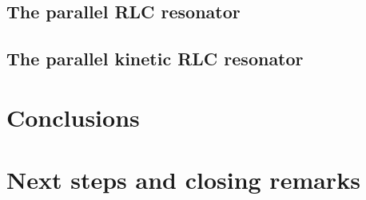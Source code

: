 \documentclass{article}
\numberwithin{equation}{section}
\begin{document}
\subsection{The parallel RLC resonator}
\label{subsec:ParallelRLC}


\subsection{The parallel kinetic RLC resonator}
\label{subsec:KineticRLC}


\newpage
\section{Conclusions}
\label{sec:Conclusions}


\section{Next steps and closing remarks} %
\label{sec:NextSteps}


\nocite{zhaoPhysicsSuperconductingTravellingWave2022}



%
% 
\end{document}
